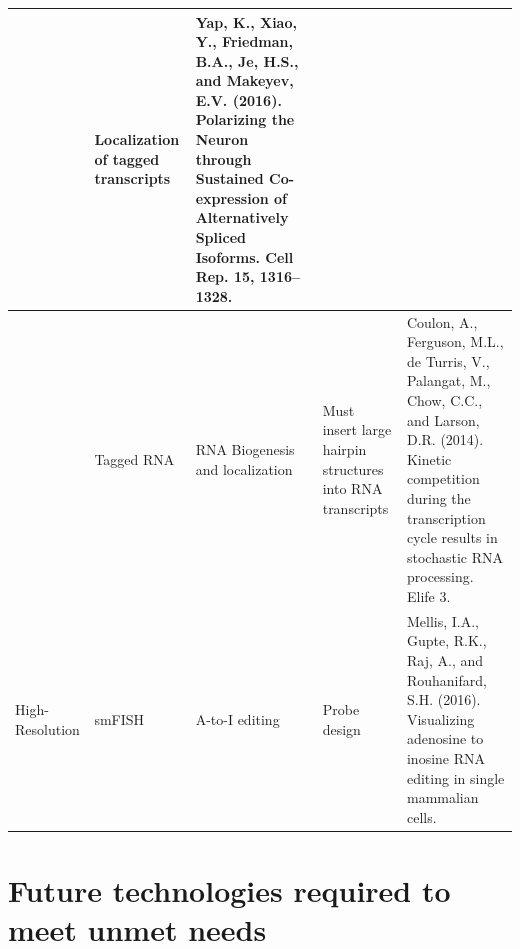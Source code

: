 \begin{table}[!ht]
\begin{center}
\begin{tabular}{ | l | l | l | l | l | }
	 & Localization of tagged transcripts & Yap, K., Xiao, Y., Friedman, B.A., Je, H.S., and Makeyev, E.V. (2016). Polarizing the Neuron through Sustained Co-expression of Alternatively Spliced Isoforms. Cell Rep. 15, 1316–1328. & \  & \  \\ \hline
	 & Tagged RNA & RNA Biogenesis and localization & Must insert large hairpin structures into RNA transcripts & Coulon, A., Ferguson, M.L., de Turris, V., Palangat, M., Chow, C.C., and Larson, D.R. (2014). Kinetic competition during the transcription cycle results in stochastic RNA processing. Elife 3. \\ \hline
	High-Resolution & smFISH & A-to-I editing & Probe design & Mellis, I.A., Gupte, R.K., Raj, A., and Rouhanifard, S.H. (2016). Visualizing adenosine to inosine RNA editing in single mammalian cells. \\ \hline
\end{tabular}
\end{center}
\label{tab:singlecell_measurement_papers}
\end{table}


\section{Future technologies required to meet unmet needs}

